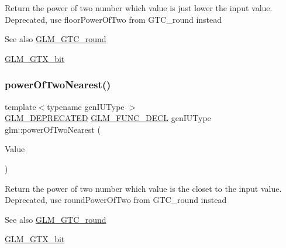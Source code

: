 Return the power of two number which value is just lower the input value. Deprecated, use floor\+Power\+Of\+Two from G\+T\+C\+\_\+round instead

\begin{DoxySeeAlso}{See also}
\hyperlink{group__gtc__round}{G\+L\+M\+\_\+\+G\+T\+C\+\_\+round} 

\hyperlink{group__gtx__bit}{G\+L\+M\+\_\+\+G\+T\+X\+\_\+bit} 
\end{DoxySeeAlso}
\mbox{\label{group__gtx__bit_ga5f65973a5d2ea38c719e6a663149ead9}} 
\subsubsection{\texorpdfstring{power\+Of\+Two\+Nearest()}{powerOfTwoNearest()}\hspace{0.1cm}{\footnotesize\ttfamily [1/2]}}
{\footnotesize\ttfamily template$<$typename gen\+I\+U\+Type $>$ \\
\hyperlink{setup_8hpp_a8edfb48cdc249a3ee48406bf179023dc}{G\+L\+M\+\_\+\+D\+E\+P\+R\+E\+C\+A\+T\+ED} \hyperlink{setup_8hpp_ab2d052de21a70539923e9bcbf6e83a51}{G\+L\+M\+\_\+\+F\+U\+N\+C\+\_\+\+D\+E\+CL} gen\+I\+U\+Type glm\+::power\+Of\+Two\+Nearest (\begin{DoxyParamCaption}\item[{gen\+I\+U\+Type}]{Value }\end{DoxyParamCaption})}

Return the power of two number which value is the closet to the input value. Deprecated, use round\+Power\+Of\+Two from G\+T\+C\+\_\+round instead

\begin{DoxySeeAlso}{See also}
\hyperlink{group__gtc__round}{G\+L\+M\+\_\+\+G\+T\+C\+\_\+round} 

\hyperlink{group__gtx__bit}{G\+L\+M\+\_\+\+G\+T\+X\+\_\+bit} 
\end{DoxySeeAlso}
\mbox{\label{group__gtx__bit_gac87e65d11e16c3d6b91c3bcfaef7da0b}} 
